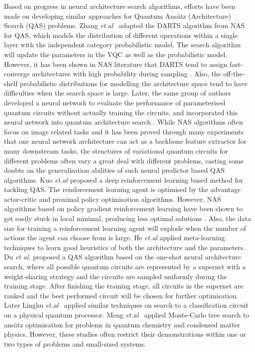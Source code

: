 \documentclass{ieeeaccess}
\begin{document}
Based on progress in neural architecture search algorithms, efforts have been made on developing similar approaches for Quantum Ans\"atz (Architecture) Search (QAS) problems. Zhang \textit{et.al}~\cite{zhang2021differentiable} adapted the DARTS algorithm \cite{DARTS_DBLP:conf/iclr/LiuSY19} from NAS for QAS, which models the distribution of different operations within a single layer with the independent category probabilistic model. The search algorithm will update the parameters in the VQC as well as the probabilistic model. However, it has been shown in NAS literature that DARTS tend to assign fast-converge architectures with high probability during sampling \cite{Shu2019-jf, Zhou2020-dg}. Also, the off-the-shelf probabilistic distributions for modelling the architecture space tend to have difficulties when the search space is large. Later, the same group of authors developed a neural network to evaluate the performance of parameterised quantum circuits without actually training the circuits, and incorporated this neural network into quantum architecture search \cite{zhang2021neural}. While NAS algorithms often focus on image related tasks and it has been proved through many experiments that one neural network architecture can act as a backbone feature extractor for many downstream tasks, the structures of variational quantum circuits for different problems often vary a great deal with different problems, casting some doubts on the generalisation abilities of such neural predictor based QAS algorithms. Kuo \textit{et.al} \cite{kuo2021quantum} proposed a deep reinforcement learning based method for tackling QAS. The reinforcement learning agent is optimised by the advantage actor-critic and proximal policy optimisation algorithms. 
However, NAS algorithms based on policy gradient reinforcement learning have been shown to get easily stuck in local minimal, producing less optimal solutions \cite{ENASpmlr-v80-pham18a, Sutton1999-nj}. Also, the data size for training a reinforcement learning agent will explode when the number of actions the agent can choose from is large. He \textit{et.al} \cite{chen2021quantum} applied meta-learning techniques to learn good heuristics of both the architecture and the parameters. Du \textit{et al.}  \cite{du2020quantum} proposed a QAS algorithm based on the one-shot neural architecture search, where all possible quantum circuits are represented by a supernet with a weight-sharing strategy and the circuits are sampled uniformly during the training stage. After finishing the training stage, all circuits in the supernet are ranked and the best performed circuit will be chosen for further optimisation. Later Linghu \textit{et.al}~\cite{Linghu2022-yy} applied similar techniques on search to a classification circuit on a physical quantum processor. Meng \textit{et.al}~\cite{9566740mctsqas} applied Monte-Carlo tree search to ans\"atz optimisation for problems in quantum chemistry and condensed matter physics. However, these studies often restrict their demonstrations within one or two types of problems and small-sized systems.
\end{document}
